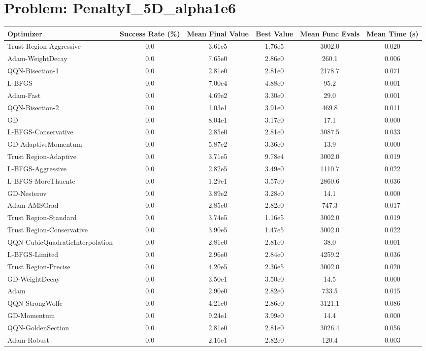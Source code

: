 \documentclass{article}
\begin{document}
\section{Problem: PenaltyI\_5D\_alpha1e6}
\begin{longtable}{p{3cm}*{5}{c}}
\toprule
\textbf{Optimizer} & \textbf{Success Rate (\%)} & \textbf{Mean Final Value} & \textbf{Best Value} & \textbf{Mean Func Evals} & \textbf{Mean Time (s)} \\
\midrule
Trust Region-Aggressive & 0.0 & 3.61e5 & 1.76e5 & 3002.0 & 0.020 \\
Adam-WeightDecay & 0.0 & 7.65e0 & 2.86e0 & 260.1 & 0.006 \\
QQN-Bisection-1 & 0.0 & 2.81e0 & 2.81e0 & 2178.7 & 0.071 \\
L-BFGS & 0.0 & 7.00e4 & 4.88e0 & 95.2 & 0.001 \\
Adam-Fast & 0.0 & 4.69e2 & 3.30e0 & 29.0 & 0.001 \\
QQN-Bisection-2 & 0.0 & 1.03e1 & 3.91e0 & 469.8 & 0.011 \\
GD & 0.0 & 8.04e1 & 3.17e0 & 17.1 & 0.000 \\
L-BFGS-Conservative & 0.0 & 2.85e0 & 2.81e0 & 3087.5 & 0.033 \\
GD-AdaptiveMomentum & 0.0 & 5.87e2 & 3.36e0 & 13.9 & 0.000 \\
Trust Region-Adaptive & 0.0 & 3.71e5 & 9.78e4 & 3002.0 & 0.019 \\
L-BFGS-Aggressive & 0.0 & 2.82e5 & 3.49e0 & 1110.7 & 0.022 \\
L-BFGS-MoreThuente & 0.0 & 1.29e1 & 3.57e0 & 2860.6 & 0.036 \\
GD-Nesterov & 0.0 & 3.89e2 & 3.28e0 & 14.1 & 0.000 \\
Adam-AMSGrad & 0.0 & 2.85e0 & 2.82e0 & 747.3 & 0.017 \\
Trust Region-Standard & 0.0 & 3.74e5 & 1.16e5 & 3002.0 & 0.019 \\
Trust Region-Conservative & 0.0 & 3.90e5 & 1.47e5 & 3002.0 & 0.022 \\
QQN-CubicQuadraticInterpolation & 0.0 & 2.81e0 & 2.81e0 & 38.0 & 0.001 \\
L-BFGS-Limited & 0.0 & 2.96e0 & 2.84e0 & 4259.2 & 0.036 \\
Trust Region-Precise & 0.0 & 4.20e5 & 2.36e5 & 3002.0 & 0.020 \\
GD-WeightDecay & 0.0 & 3.50e1 & 3.50e0 & 14.5 & 0.000 \\
Adam & 0.0 & 2.90e0 & 2.82e0 & 733.5 & 0.015 \\
QQN-StrongWolfe & 0.0 & 4.21e0 & 2.86e0 & 3121.1 & 0.086 \\
GD-Momentum & 0.0 & 9.24e1 & 3.99e0 & 14.4 & 0.000 \\
QQN-GoldenSection & 0.0 & 2.81e0 & 2.81e0 & 3026.4 & 0.056 \\
Adam-Robust & 0.0 & 2.16e1 & 2.82e0 & 120.4 & 0.003 \\
\bottomrule
\end{longtable}
\end{document}
